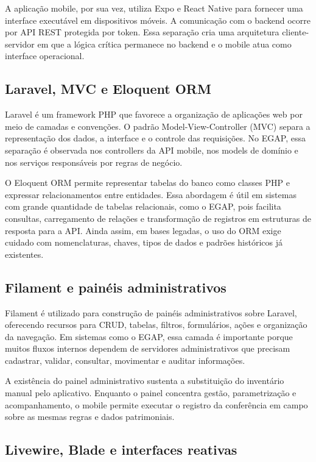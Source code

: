 \documentclass[12pt,a4paper]{article}
\begin{document}
A aplicação mobile, por sua vez, utiliza Expo e React Native para fornecer uma interface executável em dispositivos móveis. A comunicação com o backend ocorre por API REST protegida por token. Essa separação cria uma arquitetura cliente-servidor em que a lógica crítica permanece no backend e o mobile atua como interface operacional.

\subsection{Laravel, MVC e Eloquent ORM}

Laravel é um framework PHP que favorece a organização de aplicações web por meio de camadas e convenções. O padrão Model-View-Controller (MVC) separa a representação dos dados, a interface e o controle das requisições. No EGAP, essa separação é observada nos controllers da API mobile, nos models de domínio e nos serviços responsáveis por regras de negócio.

O Eloquent ORM permite representar tabelas do banco como classes PHP e expressar relacionamentos entre entidades. Essa abordagem é útil em sistemas com grande quantidade de tabelas relacionais, como o EGAP, pois facilita consultas, carregamento de relações e transformação de registros em estruturas de resposta para a API. Ainda assim, em bases legadas, o uso do ORM exige cuidado com nomenclaturas, chaves, tipos de dados e padrões históricos já existentes.

\subsection{Filament e painéis administrativos}

Filament é utilizado para construção de painéis administrativos sobre Laravel, oferecendo recursos para CRUD, tabelas, filtros, formulários, ações e organização da navegação. Em sistemas como o EGAP, essa camada é importante porque muitos fluxos internos dependem de servidores administrativos que precisam cadastrar, validar, consultar, movimentar e auditar informações.

A existência do painel administrativo sustenta a substituição do inventário manual pelo aplicativo. Enquanto o painel concentra gestão, parametrização e acompanhamento, o mobile permite executar o registro da conferência em campo sobre as mesmas regras e dados patrimoniais.

\subsection{Livewire, Blade e interfaces reativas}
\end{document}
